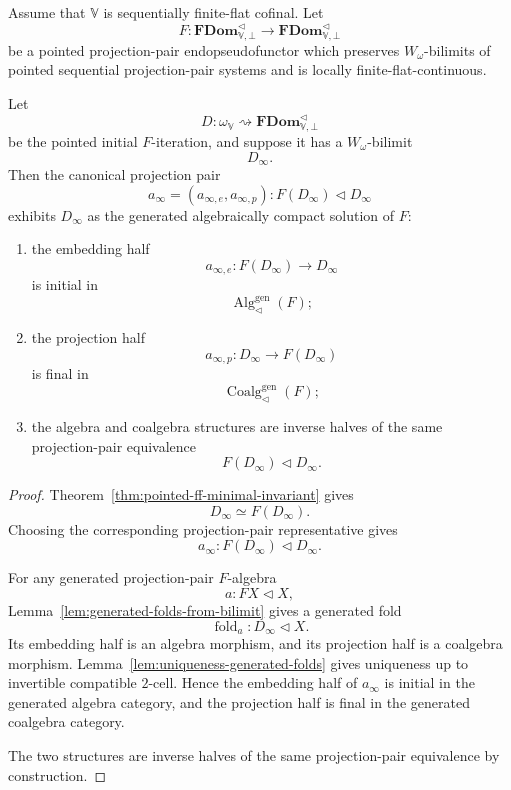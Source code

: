 \begin{theorem}
\label{thm:pointed-ff-algebraic-compactness}
Assume that \(\mathbb V\) is sequentially finite-flat cofinal.  Let
\[
    F:
    \mathbf{FDom}^{\triangleleft}_{\mathbb V,\bot}
    \to
    \mathbf{FDom}^{\triangleleft}_{\mathbb V,\bot}
\]
be a pointed projection-pair endopseudofunctor which preserves
\(W_\omega\)-bilimits of pointed sequential projection-pair systems and is
locally finite-flat-continuous.

Let
\[
    D:\omega_{\mathbb V}
      \rightsquigarrow
      \mathbf{FDom}^{\triangleleft}_{\mathbb V,\bot}
\]
be the pointed initial \(F\)-iteration, and suppose it has a
\(W_\omega\)-bilimit
\[
    D_\infty.
\]
Then the canonical projection pair
\[
    a_\infty=(a_{\infty,e},a_{\infty,p}):
    F(D_\infty)\triangleleft D_\infty
\]
exhibits \(D_\infty\) as the generated algebraically compact solution of \(F\):

\begin{enumerate}
    \item the embedding half
    \[
        a_{\infty,e}:F(D_\infty)\to D_\infty
    \]
    is initial in
    \[
        \operatorname{Alg}^{\mathrm{gen}}_{\triangleleft}(F);
    \]

    \item the projection half
    \[
        a_{\infty,p}:D_\infty\to F(D_\infty)
    \]
    is final in
    \[
        \operatorname{Coalg}^{\mathrm{gen}}_{\triangleleft}(F);
    \]

    \item the algebra and coalgebra structures are inverse halves of the same
    projection-pair equivalence
    \[
        F(D_\infty)\triangleleft D_\infty.
    \]
\end{enumerate}
\end{theorem}

\begin{proof}
Theorem~\ref{thm:pointed-ff-minimal-invariant} gives
\[
    D_\infty\simeq F(D_\infty).
\]
Choosing the corresponding projection-pair representative gives
\[
    a_\infty:F(D_\infty)\triangleleft D_\infty.
\]

For any generated projection-pair \(F\)-algebra
\[
    a:FX\triangleleft X,
\]
Lemma~\ref{lem:generated-folds-from-bilimit} gives a generated fold
\[
    \operatorname{fold}_a:D_\infty\triangleleft X.
\]
Its embedding half is an algebra morphism, and its projection half is a
coalgebra morphism.  Lemma~\ref{lem:uniqueness-generated-folds} gives
uniqueness up to invertible compatible \(2\)-cell.  Hence the embedding half of
\(a_\infty\) is initial in the generated algebra category, and the projection
half is final in the generated coalgebra category.

The two structures are inverse halves of the same projection-pair equivalence
by construction.
\end{proof}

